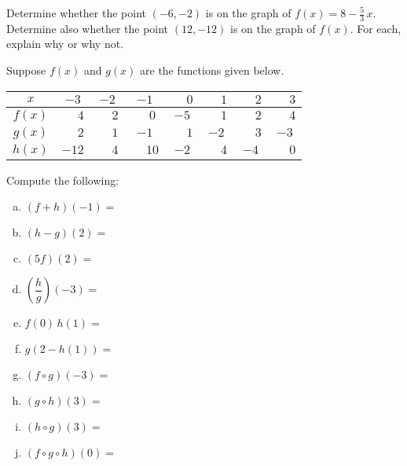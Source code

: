 \documentclass[11pt,letterpaper]{article}
\begin{document}

 Determine whether the point $(-6, -2)$ is on the graph of $f(x)= 8 - \frac{5}{3}\,x$. Determine also whether the point $(12, -12)$ is on the graph of $f(x)$. For each, explain why or why not. 



\newpage



 Suppose $f(x)$ and $g(x)$ are the functions given below. 
        \begin{table}[!ht]
        \centering
        \begin{tabular}{| c || c | c | c | c | c | c | c |} \hline
	$x$ & $-3$ & $-2$ & $-1$ & $\phantom{-}0$ & $\phantom{-}1$ & $\phantom{-}2$ & $\phantom{-}3$ \\ \hline
	$f(x)$ & $\phantom{-1}4$ & $\phantom{-}2$ & $\phantom{-}0$ & $-5$ & $\phantom{-}1$ & $\phantom{-}2$ & $\phantom{-}4$ \\ \hline
	$g(x)$ & $\phantom{-1}2$ & $\phantom{-}1$ & $-1$ & $\phantom{-}1$ & $-2$ & $\phantom{-}3$ & $-3$ \\ \hline
	$h(x)$ & $-12$ & $\phantom{-}4$ & $\phantom{-}10$ & $-2$ & $\phantom{-}4$ & $-4$ & $\phantom{-}0$ \\ \hline
        \end{tabular}
        \end{table}

Compute the following: \pspace
        \begin{enumerate}[(a)]
        \item $(f + h)(-1)=$ \vfill
        \item $(h - g)(2)=$ \vfill
        \item $(5f)(2)=$ \vfill
        \item $\left(\dfrac{h}{g}\right)(-3)=$ \vfill
        \item $f(0)\, h(1)=$ \vfill
        \item $g(2 - h(1))=$ \vfill
        \item $(f \circ g)(-3)=$ \vfill
	\item $(g \circ h)(3)=$ \vfill
        \item $(h \circ g)(3)=$ \vfill
	\item $(f \circ g \circ h)(0)=$ \vfill
        \end{enumerate} 



\newpage
\end{document}

